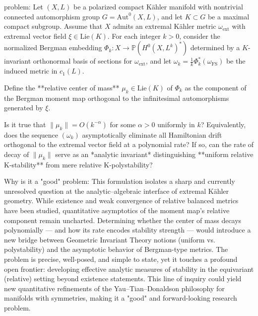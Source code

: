 problem:  
Let \((X,L)\) be a polarized compact Kähler manifold with nontrivial connected automorphism group \(G = \mathrm{Aut}^0(X,L)\), and let \(K \subset G\) be a maximal compact subgroup. Assume that \(X\) admits an extremal Kähler metric \(\omega_{\mathrm{ext}}\) with extremal vector field \(\xi \in \mathrm{Lie}(K)\). For each integer \(k>0\), consider the normalized Bergman embedding \(\Phi_k: X \to \mathbb{P}(H^0(X,L^k)^*)\) determined by a \(K\)-invariant orthonormal basis of sections for \(\omega_{\mathrm{ext}}\), and let \(\omega_k = \frac{1}{k}\Phi_k^*(\omega_{\mathrm{FS}})\) be the induced metric in \(c_1(L)\).  

Define the **relative center of mass** \(\mu_k \in \mathrm{Lie}(K)\) of \(\Phi_k\) as the component of the Bergman moment map orthogonal to the infinitesimal automorphisms generated by \(\xi\).  

Is it true that \(\|\mu_k\| = O(k^{-\alpha})\) for some \(\alpha>0\) uniformly in \(k\)? Equivalently, does the sequence \((\omega_k)\) asymptotically eliminate all Hamiltonian drift orthogonal to the extremal vector field at a polynomial rate?  
If so, can the rate of decay of \(\|\mu_k\|\) serve as an *analytic invariant* distinguishing **uniform relative K-stability** from mere relative K-polystability?  

Why is it a "good" problem:  
This formulation isolates a sharp and currently unresolved question at the analytic–algebraic interface of extremal Kähler geometry. While existence and weak convergence of relative balanced metrics have been studied, quantitative asymptotics of the moment map’s relative component remain uncharted. Determining whether the center of mass decays polynomially — and how its rate encodes stability strength — would introduce a new bridge between Geometric Invariant Theory notions (uniform vs. polystability) and the asymptotic behavior of Bergman-type metrics. The problem is precise, well-posed, and simple to state, yet it touches a profound open frontier: developing effective analytic measures of stability in the equivariant (relative) setting beyond existence statements. This line of inquiry could yield new quantitative refinements of the Yau–Tian–Donaldson philosophy for manifolds with symmetries, making it a "good" and forward-looking research problem.